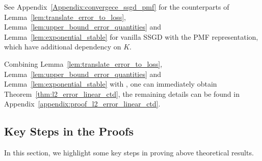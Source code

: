 See Appendix~\ref{Appendix:convergece_ssgd_pmf} for the counterparts of Lemma~\ref{lem:translate_error_to_loss}, Lemma~\ref{lem:upper_bound_error_quantities} and Lemma~\ref{lem:exponential_stable} for vanilla SSGD with the PMF representation, which have additional dependency on $K$.

Combining Lemma~\ref{lem:translate_error_to_loss}, Lemma~\ref{lem:upper_bound_error_quantities} and Lemma~\ref{lem:exponential_stable} with \citep[Theorem~1][]{samsonov2024improved}, one can  immediately obtain Theorem~\ref{thm:l2_error_linear_ctd}, the remaining details can be found in Appendix~\ref{appendix:proof_l2_error_linear_ctd}.

\subsection{Key Steps in the Proofs}
In this section, we highlight some key steps in proving above theoretical results.
